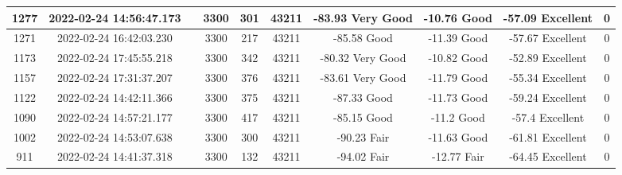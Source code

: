 \begin{longtable*}{|c|c|c|c|c|c|c|c|c|c|}
1277&2022-02-24 14:56:47.173&&3300&301&43211& -83.93    Very Good   & -10.76    Good        & -57.09    Excellent   & 0\\\hline
{}1271&2022-02-24 16:42:03.230&&3300&217&43211& -85.58    Good        & -11.39    Good        & -57.67    Excellent   & 0\\\hline
{}1173&2022-02-24 17:45:55.218&&3300&342&43211& -80.32    Very Good   & -10.82    Good        & -52.89    Excellent   & 0\\\hline
{}1157&2022-02-24 17:31:37.207&&3300&376&43211& -83.61    Very Good   & -11.79    Good        & -55.34    Excellent   & 0\\\hline
{}1122&2022-02-24 14:42:11.366&&3300&375&43211& -87.33    Good        & -11.73    Good        & -59.24    Excellent   & 0\\\hline
{}1090&2022-02-24 14:57:21.177&&3300&417&43211& -85.15    Good        & -11.2     Good        & -57.4     Excellent   & 0\\\hline
{}1002&2022-02-24 14:53:07.638&&3300&300&43211& -90.23    Fair        & -11.63    Good        & -61.81    Excellent   & 0\\\hline
{}911&2022-02-24 14:41:37.318&&3300&132&43211& -94.02    Fair        & -12.77    Fair        & -64.45    Excellent   & 0\\\hline

\end{longtable*}
